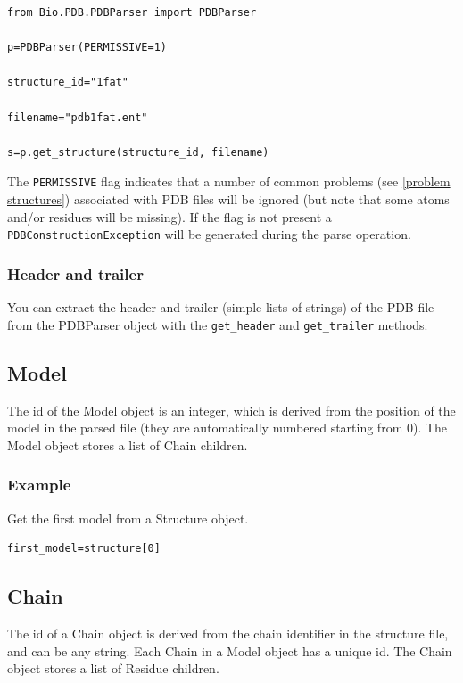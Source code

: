 \documentclass{report}
\begin{document}
\begin{verbatim}
from Bio.PDB.PDBParser import PDBParser

p=PDBParser(PERMISSIVE=1)

structure_id="1fat"

filename="pdb1fat.ent"

s=p.get_structure(structure_id, filename)
\end{verbatim}

The {\tt PERMISSIVE} flag indicates that a number of common problems (see \ref{problem structures})
associated with PDB files will be ignored (but note that some atoms and/or residues
will be missing). If the flag is not present a {\tt PDBConstructionException}
will be generated during the parse operation.

\subsubsection{Header and trailer}

You can extract the header and trailer (simple lists of strings) of the PDB
file from the PDBParser object with the {\tt get\_header} and {\tt get\_trailer}
methods.

\subsection{Model}

The id of the Model object is an integer, which is derived from the position
of the model in the parsed file (they are automatically numbered starting from
0). The Model object stores a list of Chain children.

\subsubsection{Example}

Get the first model from a Structure object.

\begin{verbatim}
first_model=structure[0]
\end{verbatim}

\subsection{Chain}

The id of a Chain object is derived from the chain identifier in the structure
file, and can be any string. Each Chain in a Model object has a unique id. The
Chain object stores a list of Residue children.
\end{document}
